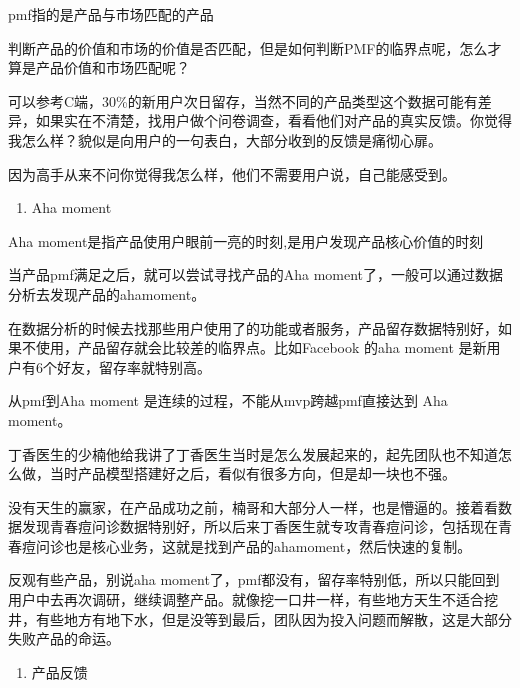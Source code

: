 \documentclass[letterpaper,10pt,english]{sphinxmanual}
\begin{document}
pmf指的是产品与市场匹配的产品

判断产品的价值和市场的价值是否匹配，但是如何判断PMF的临界点呢，怎么才算是产品价值和市场匹配呢？

可以参考C端，30\%的新用户次日留存，当然不同的产品类型这个数据可能有差异，如果实在不清楚，找用户做个问卷调查，看看他们对产品的真实反馈。你觉得我怎么样？貌似是向用户的一句表白，大部分收到的反馈是痛彻心扉。

因为高手从来不问你觉得我怎么样，他们不需要用户说，自己能感受到。
\begin{enumerate}
%
\setcounter{enumi}{2}
\item {} 
Aha moment

\end{enumerate}

Aha moment是指产品使用户眼前一亮的时刻,是用户发现产品核心价值的时刻

当产品pmf满足之后，就可以尝试寻找产品的Aha
moment了，一般可以通过数据分析去发现产品的ahamoment。

在数据分析的时候去找那些用户使用了的功能或者服务，产品留存数据特别好，如果不使用，产品留存就会比较差的临界点。比如Facebook
的aha moment 是新用户有6个好友，留存率就特别高。

从pmf到Aha moment 是连续的过程，不能从mvp跨越pmf直接达到 Aha moment。

丁香医生的少楠他给我讲了丁香医生当时是怎么发展起来的，起先团队也不知道怎么做，当时产品模型搭建好之后，看似有很多方向，但是却一块也不强。

没有天生的赢家，在产品成功之前，楠哥和大部分人一样，也是懵逼的。接着看数据发现青春痘问诊数据特别好，所以后来丁香医生就专攻青春痘问诊，包括现在青春痘问诊也是核心业务，这就是找到产品的ahamoment，然后快速的复制。

反观有些产品，别说aha
moment了，pmf都没有，留存率特别低，所以只能回到用户中去再次调研，继续调整产品。就像挖一口井一样，有些地方天生不适合挖井，有些地方有地下水，但是没等到最后，团队因为投入问题而解散，这是大部分失败产品的命运。
\begin{enumerate}
%
\item {} 
产品反馈
%
\begin{footnote}[826]\sphinxAtStartFootnote
{}
%
\end{footnote}

\end{enumerate}
\end{document}
